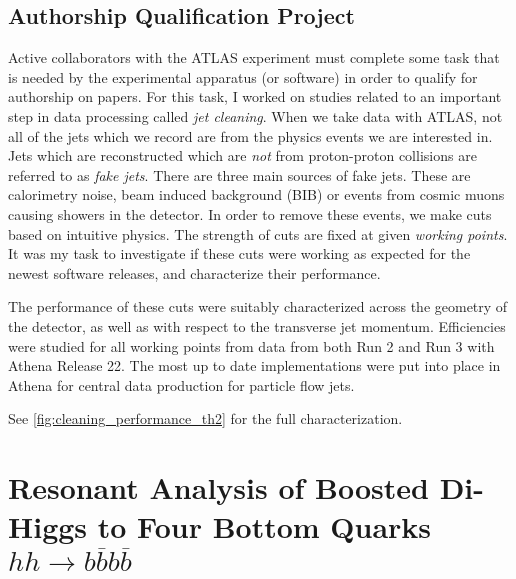 \documentclass[12pt]{article}
\begin{document}
\subsection{Authorship Qualification Project}
Active collaborators with the ATLAS experiment must complete some task that is
needed by the experimental apparatus (or software) in order to qualify for
authorship on papers. For this task, I worked on studies related to an important
step in data processing called \textit{jet cleaning}. When we take data with
ATLAS, not all of the jets which we record are from the physics events we are
interested in. Jets which are reconstructed which are \textit{not} from
proton-proton collisions are referred to as \textit{fake jets}. There are three
main sources of fake jets. These are calorimetry noise, beam induced background
(BIB) or events from cosmic muons causing showers in the detector. In order to
remove these events, we make cuts based on intuitive physics. The strength of
cuts are fixed at given \textit{working points}. It was my task to investigate
if these cuts were working as expected for the newest software releases, and
characterize their performance.


The performance of these cuts were suitably characterized across the geometry of
the detector, as well as with respect to the transverse jet momentum.
Efficiencies were studied for all working points from data from both Run 2 and
Run 3 with Athena Release 22. The most up to date implementations were put into
place in Athena for central data production for particle flow jets.

See \ref{fig:cleaning_performance_th2} for the full characterization.

\section{Resonant Analysis of Boosted Di-Higgs to Four Bottom Quarks
$hh\rightarrow b\overline{b}b\overline{b}$}
\end{document}
